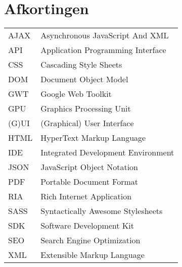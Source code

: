\documentclass[master=cws,dutch]{kulemt}
\begin{document}
\section*{Afkortingen}
\begin{flushleft}
  \renewcommand{\arraystretch}{1.1}
  \begin{tabularx}{\textwidth}{@{}p{12mm}X@{}}
     AJAX & Asynchronous JavaScript And XML \\
     API & Application Programming Interface \\
     CSS & Cascading Style Sheets \\
     DOM & Document Object Model \\
     GWT & Google Web Toolkit \\
     GPU & Graphics Processing Unit \\
     (G)UI & (Graphical) User Interface \\
     HTML & HyperText Markup Language \\
     IDE & Integrated Development Environment \\
     JSON & JavaScript Object Notation \\
     PDF & Portable Document Format \\
     RIA & Rich Internet Application \\
     SASS & Syntactically Awesome Stylesheets \\
     SDK & Software Development Kit \\
     SEO & Search Engine Optimization \\
     XML & Extensible Markup Language
  \end{tabularx}
\end{flushleft}

\mainmatter









%
%

\backmatter


\end{document}
